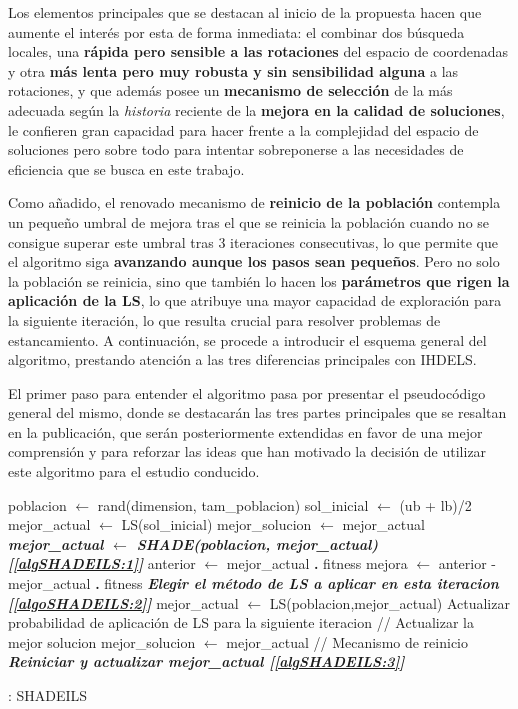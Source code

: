 Los elementos principales que se destacan al inicio de la propuesta hacen que aumente el interés por esta de forma inmediata: el combinar dos búsqueda locales, una \textbf{rápida pero sensible a las rotaciones} del espacio de coordenadas y otra \textbf{más lenta pero muy robusta y sin sensibilidad alguna} a las rotaciones, y que además posee un \textbf{mecanismo de selección} de la más adecuada según la \textit{historia} reciente de la \textbf{mejora en la calidad de soluciones}, le confieren gran capacidad para hacer frente a la complejidad del espacio de soluciones pero sobre todo para intentar sobreponerse a las necesidades de eficiencia que se busca en este trabajo. 

Como añadido, el renovado mecanismo de \textbf{reinicio de la población} contempla un pequeño umbral de mejora tras el que se reinicia la población cuando no se consigue superar este umbral tras 3 iteraciones consecutivas, lo que permite que el algoritmo siga \textbf{avanzando aunque los pasos sean pequeños}. Pero no solo la población se reinicia, sino que también lo hacen los \textbf{parámetros que rigen la aplicación de la LS}, lo que atribuye una mayor capacidad de exploración para la siguiente iteración, lo que resulta crucial para resolver problemas de estancamiento. A continuación, se procede a introducir el esquema general del algoritmo, prestando atención a las tres diferencias principales con IHDELS.

El primer paso para entender el algoritmo pasa por presentar el pseudocódigo general del mismo, donde se destacarán las tres partes principales que se resaltan en la publicación, que serán posteriormente extendidas en favor de una mejor comprensión y para reforzar las ideas que han motivado la decisión de utilizar este algoritmo para el estudio conducido.

\begin{algorithm}[h]
	\begin{algorithmic}[1]
		\STATE poblacion $\leftarrow$ rand(dimension, tam\_poblacion)
		\STATE sol\_inicial  $\leftarrow$ (ub + lb)/2
		\STATE mejor\_actual $\leftarrow$ LS(sol\_inicial)
		\STATE mejor\_solucion $\leftarrow$ mejor\_actual
			\STATE \textit{\textbf{mejor\_actual $\leftarrow$ SHADE(poblacion, mejor\_actual) [\ref{algSHADEILS:1}]}}
			\STATE anterior $\leftarrow$ mejor\_actual \textbf{.} fitness 
			\STATE mejora $\leftarrow$ anterior - mejor\_actual \textbf{.} fitness
			\STATE \textit{\textbf{Elegir el método de LS a aplicar en esta iteracion [\ref{algoSHADEILS:2}]}}
			\STATE mejor\_actual $\leftarrow$ LS(poblacion,mejor\_actual)
			\STATE Actualizar probabilidad de aplicación de LS para la siguiente iteracion
			\STATE // Actualizar la mejor solucion
				\STATE mejor\_solucion $\leftarrow$ mejor\_actual
			\ENDIF
			\STATE // Mecanismo de reinicio
				\STATE \textit{\textbf{Reiniciar y actualizar mejor\_actual [\ref{algSHADEILS:3}]}}
			\ENDIF
			
		\ENDWHILE
		
	\end{algorithmic}
	\caption{: SHADEILS} \label{Alg: SHADEILS}
\end{algorithm}


